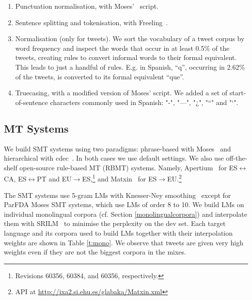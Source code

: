 \documentclass[postprint]{flammie}
\begin{document}
\begin{enumerate}
\item Punctuation normalisation, with Moses'~\cite{Koehn:2007:MOS:1557769.1557821} script.
\item Sentence splitting and tokenisation, with Freeling~\cite{padro12}.
\item Normalisation (only for tweets). We sort the vocabulary of a tweet corpus by word frequency and inspect the words that occur in at least 0.5\% of the tweets, creating rules to convert informal words to their formal equivalent.
This leads to just a handful of rules. E.g. in Spanish, ``q'', occurring in 2.62\% of the tweets, is converted to its formal equivalent ``que''.%
\item Truecasing, with a modified version of Moses' script. We added a set of start-of-sentence characters commonly used in Spanish: "-", "—", "¿", "“" and "‘".
\end{enumerate}

\subsection{MT Systems}\label{sec:mt_systems}%

We build SMT systems using two paradigms: phrase-based with Moses~\cite{Koehn:2007:MOS:1557769.1557821} and hierarchical with cdec~\cite{cdec}.
In both cases we use default settings.
We also use off-the-shelf open-source rule-based MT (RBMT) systems.
Namely, Apertium~\cite{forcada11a} for ES$\leftrightarrow$CA, ES$\leftrightarrow$PT and EU$\rightarrow$ES,\footnote{Revisions 60356, 60384, and 60356, respectively.} and Matxin~\cite{DBLP:journals/mt/MayorASLLS11} for ES$\rightarrow$EU.\footnote{API at \url{http://ixa2.si.ehu.es/glabaka/Matxin.xml}}

The SMT systems use 5-gram LMs with Knesser-Ney smoothing~\cite{kneser1995improved} except for ParFDA Moses SMT systems, which use LMs of order 8 to 10.
We build LMs on individual monolingual corpora (cf. Section \ref{monolingualcorpora}) and interpolate them with SRILM~\cite{stolcke2002srilm} to minimise the perplexity on the dev set.
Each target language and its corpora used to build LMs together with their interpolation weights are shown in Table \ref{t:mono}.
We observe that tweets are given very high weights even if they are not the biggest corpora in the mixes.


\end{document}
